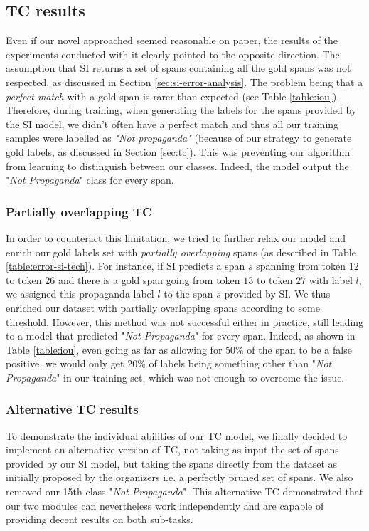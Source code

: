 \documentclass[11pt]{article}
\newcommand{\pol}[1]{{\fontfamily{pcr}\selectfont#1}}
\begin{document}
\subsection{\pol{TC} results} \label{sec:tc-results}
Even if our novel approached seemed reasonable on paper, the results of the experiments conducted with it clearly pointed to the opposite direction. The assumption that \pol{SI} returns a set of spans containing all the gold spans was not respected, as discussed in Section \ref{sec:si-error-analysis}. The problem being that a \textit{perfect match} with a gold span is rarer than expected (see Table \ref{table:iou}). Therefore, during training, when generating the labels for the spans provided by the \pol{SI} model, we didn't often have a perfect match and thus all our training samples were labelled as \textit{"Not propaganda"} (because of our strategy to generate gold labels, as discussed in Section \ref{sec:tc}). This was preventing our algorithm from learning to distinguish between our classes. Indeed, the model output the "\textit{Not Propaganda}" class for every span.

\subsubsection*{Partially overlapping \pol{TC}}
In order to counteract this limitation, we tried to further relax our model and enrich our gold labels set with \textit{partially overlapping} spans (as described in Table \ref{table:error-si-tech}). For instance, if \pol{SI} predicts a span $s$ spanning from token $12$ to token $26$ and there is a gold span going from token $13$ to token $27$ with label $l$, we assigned this propaganda label $l$ to the span $s$ provided by \pol{SI}. We thus enriched our dataset with partially overlapping spans according to some threshold. However, this method was not successful either in practice, still leading to a model that predicted "\textit{Not Propaganda}" for every span. Indeed, as shown in Table \ref{table:iou}, even going as far as allowing for 50\% of the span to be a false positive, we would only get 20\% of labels being something other than "\textit{Not Propaganda}" in our training set, which was not enough to overcome the issue.

\subsubsection{Alternative \pol{TC} results}
To demonstrate the individual abilities of our \pol{TC} model, we finally decided to implement an alternative version of \pol{TC}, not taking as input the set of spans provided by our \pol{SI} model, but taking the spans directly from the dataset as initially proposed by the organizers i.e. a perfectly pruned set of spans. We also removed our 15th class "\textit{Not Propaganda}". This alternative \pol{TC} demonstrated that our two modules can nevertheless work independently and are capable of providing decent results on both sub-tasks.
\end{document}
